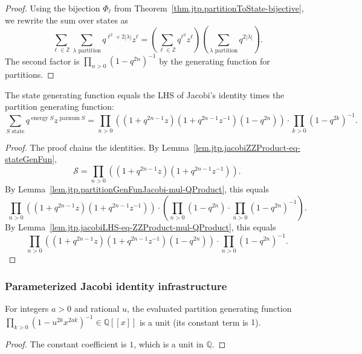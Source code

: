 \begin{proof}
Using the bijection $\Phi_{\ell}$ from Theorem~\ref{thm.jtp.partitionToState-bijective},
we rewrite the sum over states as
\[
\sum_{\ell\in\mathbb{Z}}\sum_{\lambda\text{ partition}}
q^{\ell^{2}+2|\lambda|}z^{\ell}
=\left(\sum_{\ell\in\mathbb{Z}}q^{\ell^{2}}z^{\ell}\right)
\left(\sum_{\lambda\text{ partition}}q^{2|\lambda|}\right).
\]
The second factor is $\prod_{n>0}(1-q^{2n})^{-1}$ by the generating
function for partitions.
\end{proof}

\begin{lemma}
\label{lem.jtp.stateGenFun-eq-lhs}
\leanhelper
\leanok
The state generating function equals the LHS of Jacobi's identity
times the partition generating function:
\[
\sum_{S\text{ state}}q^{\operatorname{energy}S}z^{\operatorname{parnum}S}
=\prod_{n>0}\left((1+q^{2n-1}z)(1+q^{2n-1}z^{-1})(1-q^{2n})\right)
\cdot\prod_{k>0}(1-q^{2k})^{-1}.
\]
\end{lemma}

\begin{proof}
The proof chains the identities.
By Lemma~\ref{lem.jtp.jacobiZZProduct-eq-stateGenFun},
\[
\mathcal{S} = \prod_{n>0}((1+q^{2n-1}z)(1+q^{2n-1}z^{-1})).
\]
By Lemma~\ref{lem.jtp.partitionGenFunJacobi-mul-QProduct}, this equals
\[
\prod_{n>0}((1+q^{2n-1}z)(1+q^{2n-1}z^{-1})) \cdot \left(\prod_{n>0}(1-q^{2n}) \cdot \prod_{n>0}(1-q^{2n})^{-1}\right).
\]
By Lemma~\ref{lem.jtp.jacobiLHS-eq-ZZProduct-mul-QProduct}, this equals
\[
\prod_{n>0}\left((1+q^{2n-1}z)(1+q^{2n-1}z^{-1})(1-q^{2n})\right) \cdot \prod_{n>0}(1-q^{2n})^{-1}.
\]
\end{proof}

\subsubsection{Parameterized Jacobi identity infrastructure}

\begin{lemma}
\label{lem.jtp.partitionGenFunEval-isUnit}
\leanhelper
\leanok
For integers $a>0$ and rational $u$, the evaluated partition generating
function $\prod_{k>0}(1-u^{2k}x^{2ak})^{-1}\in\mathbb{Q}[[x]]$
is a unit (its constant term is $1$).
\end{lemma}

\begin{proof}
\leanok
The constant coefficient is $1$, which is a unit in $\mathbb{Q}$.
\end{proof}

